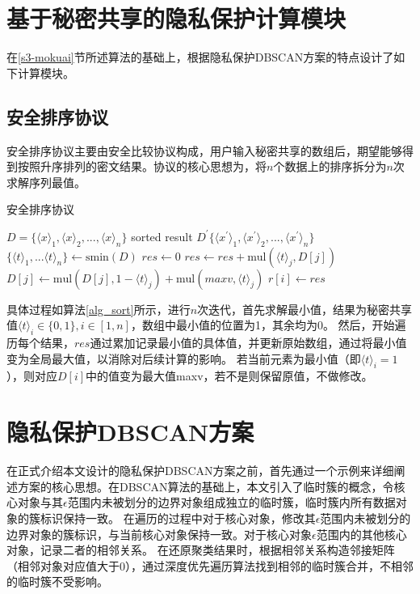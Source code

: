 \section{基于秘密共享的隐私保护计算模块}
\label{s4-subpro}
在\ref{s3-mokuai}节所述算法的基础上，根据隐私保护DBSCAN方案的特点设计了如下计算模块。
\subsection{安全排序协议}
安全排序协议主要由安全比较协议构成，用户输入秘密共享的数组后，期望能够得到按照升序排列的密文结果。协议的核心思想为，将$ n $个数据上的排序拆分为$ n $次求解序列最值。
\begin{algorithm}[htbp]
	\renewcommand{\algorithmicrequire}{\textbf{输入:}}
	\renewcommand{\algorithmicensure}{\textbf{输出:}}
	\caption{安全排序协议}
	\label{alg_sort}
	\begin{algorithmic}[1]
		\REQUIRE $ D = \{\langle x\rangle_1, \langle x\rangle_2,...,\langle x\rangle_n\} $
		\ENSURE sorted result $ D^{\prime}\{\langle x^{\prime}\rangle_1, \langle x^{\prime}\rangle_2,...,\langle x^{\prime}\rangle_n\} $
		\STATE $ \{\langle t\rangle_1,...\langle t \rangle_n\} \leftarrow \text{smin}(D)$
		\STATE $ res \leftarrow 0 $
		\STATE $ res \leftarrow res + \text{mul}(\langle t \rangle_j, D[j]) $
		\STATE $ D[j] \leftarrow \text{mul}(D[j],1-\langle t \rangle_j) + \text{mul}(maxv, \langle t \rangle_j)$
		\ENDFOR
		\STATE $ r[i] \leftarrow res $
		\ENDFOR
	\end{algorithmic}
\end{algorithm}

具体过程如算法\ref{alg_sort}所示，进行$ n $次迭代，首先求解最小值，结果为秘密共享值$ \langle t \rangle_i \in \{0,1\}, i\in[1,n] $，数组中最小值的位置为1，其余均为0。
然后，开始遍历每个结果，$ res $通过累加记录最小值的具体值，并更新原始数组，通过将最小值变为全局最大值，以消除对后续计算的影响。
若当前元素为最小值（即$\langle t \rangle_i=1  $ ），则对应$ D[i] $中的值变为最大值maxv，若不是则保留原值，不做修改。


\section{隐私保护DBSCAN方案}
\label{s4-t1}
在正式介绍本文设计的隐私保护DBSCAN方案之前，首先通过一个示例来详细阐述方案的核心思想。在DBSCAN算法的基础上，本文引入了临时簇的概念，令核心对象与其$ \epsilon $范围内未被划分的边界对象组成独立的临时簇，临时簇内所有数据对象的簇标识保持一致。
在遍历的过程中对于核心对象，修改其$ \epsilon $范围内未被划分的边界对象的簇标识，与当前核心对象保持一致。对于核心对象$ \epsilon $范围内的其他核心对象，记录二者的相邻关系。
在还原聚类结果时，根据相邻关系构造邻接矩阵（相邻对象对应值大于0），通过深度优先遍历算法找到相邻的临时簇合并，不相邻的临时簇不受影响。

